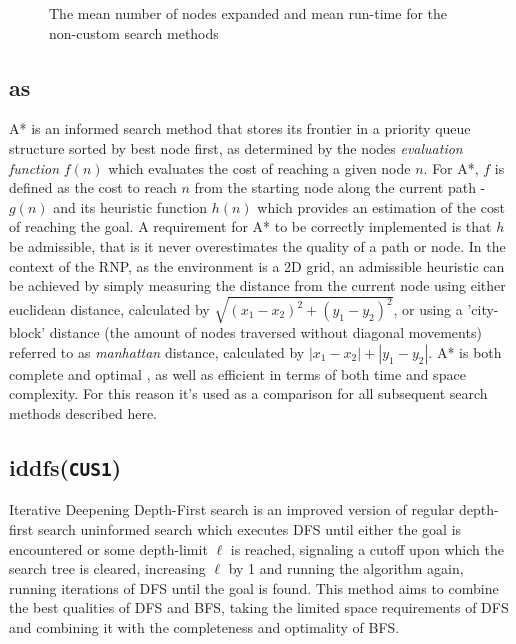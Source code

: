 \begin{figure}[H]
	\hfill
	\hfill
	\caption{The mean number of nodes expanded and mean run-time for the non-custom search methods}
	\label{fig:mean_runtime_expanded}
\end{figure}


\subsection{\texorpdfstring{\acrfull{as}}{A*}} %
\label{sub:as}
A* is an \gls{informed} search method that stores its frontier in a priority queue structure sorted by best node first, as determined by the nodes \textit{evaluation function} $f(n)$ which evaluates the cost of reaching a given node $n$. For A*, $f$ is defined as the cost to reach $n$ from the starting node along the current path - $g(n)$ and its heuristic function $h(n)$ which provides an estimation of the cost of reaching the goal. A requirement for A* to be correctly implemented is that $h$ be \gls{admissible}, that is it never overestimates the quality of a path or node. In the context of the RNP, as the environment is a 2D grid, an admissible heuristic can be achieved by simply measuring the distance from the current node using either euclidean distance, calculated by $\sqrt{(x_1 - x_2)^2 + (y_1 - y_2)^2}$, or using a 'city-block' distance (the amount of nodes traversed without diagonal movements) referred to as \textit{manhattan} distance, calculated by $\left|x_1 - x_2\right| + \left|y_1 - y_2\right|$. A* is both complete and optimal \parencite[104]{astar}, as well as efficient in terms of both time and space complexity. For this reason it's used as a comparison for all subsequent search methods described here.

\subsection{\texorpdfstring{\acrfull{iddfs}(\texttt{CUS1})}{IDDFS}} %
\label{sub:iddfs}
Iterative Deepening Depth-First search is an improved version of regular depth-first search uninformed search which executes DFS until either the goal is encountered or some depth-limit $\ell$ is reached, signaling a cutoff upon which the search tree is cleared, increasing $\ell$ by 1 and running the algorithm again, running iterations of DFS until the goal is found. This method aims to combine the best qualities of DFS and BFS, taking the limited space requirements of DFS and combining it with the completeness and optimality of BFS.

